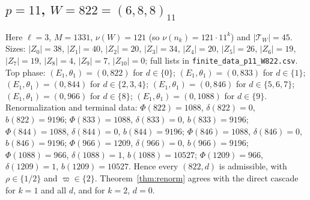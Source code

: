 \subsection*{$p=11$, $W=822=(6,8,8)_{11}$}
Here $\ell=3$, $M=1331$, $\nu(W)=121$ (so $\nu(n_k)=121\cdot11^k$) and $|\mathcal T_W|=45$.
Sizes: $|Z_{0}|=38$, $|Z_{1}|=40$, $|Z_{2}|=20$, $|Z_{3}|=34$, $|Z_{4}|=20$, $|Z_{5}|=26$, $|Z_{6}|=19$, $|Z_{7}|=19$, $|Z_{8}|=4$, $|Z_{9}|=7$, $|Z_{10}|=0$; full lists in \texttt{finite\_data\_p11\_W822.csv}.
Top phase: $(E_1,\theta_1)=(0,822)$ for $d\in\{0\}$; $(E_1,\theta_1)=(0,833)$ for $d\in\{1\}$; $(E_1,\theta_1)=(0,844)$ for $d\in\{2,3,4\}$; $(E_1,\theta_1)=(0,846)$ for $d\in\{5,6,7\}$; $(E_1,\theta_1)=(0,966)$ for $d\in\{8\}$; $(E_1,\theta_1)=(0,1088)$ for $d\in\{9\}$.
Renormalization and terminal data: $\Phi(822)=1088$, $\delta(822)=0$, $b(822)=9196$; $\Phi(833)=1088$, $\delta(833)=0$, $b(833)=9196$; $\Phi(844)=1088$, $\delta(844)=0$, $b(844)=9196$; $\Phi(846)=1088$, $\delta(846)=0$, $b(846)=9196$; $\Phi(966)=1209$, $\delta(966)=0$, $b(966)=9196$; $\Phi(1088)=966$, $\delta(1088)=1$, $b(1088)=10527$; $\Phi(1209)=966$, $\delta(1209)=1$, $b(1209)=10527$. Hence every $(822,d)$ is admissible, with $\rho\in\{1/2\}$ and $\varpi\in\{2\}$. Theorem~\ref{thm:renorm} agrees with the direct cascade for $k=1$ and all $d$, and for $k=2$, $d=0$.

